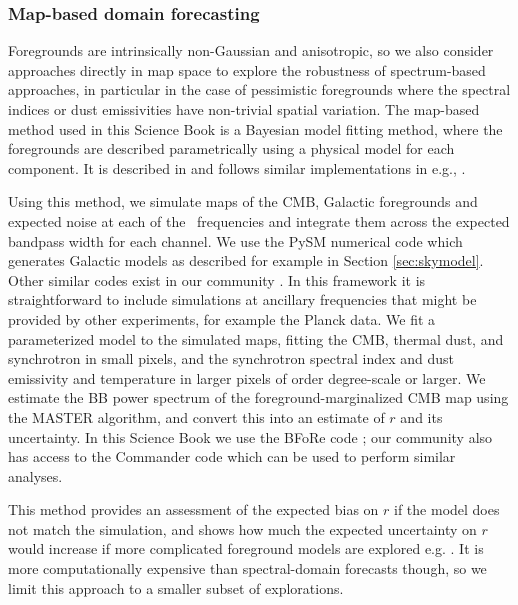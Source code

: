 \subsubsection{Map-based domain forecasting}

Foregrounds are intrinsically non-Gaussian and anisotropic, so we also consider approaches directly in map space to explore the robustness of spectrum-based approaches, in particular in the case of pessimistic foregrounds where the spectral indices or dust emissivities have non-trivial spatial variation. The map-based method used in this Science Book is a Bayesian model fitting method, where the foregrounds are described parametrically using a physical model for each component. It is described in \cite{Alonso:prep} and follows similar implementations in e.g., \cite{Eriksen:2005dr}.

Using this method, we simulate maps of the CMB, Galactic foregrounds and expected noise at each of the \cmbexp\ frequencies and integrate them across the expected bandpass width for each channel. We use the PySM numerical code \cite{PySM} which generates Galactic models as described for example in Section \ref{sec:skymodel}. Other similar codes exist in our community \cite{Delabrouille:2012ye}. In this framework it is straightforward to include simulations at ancillary frequencies that might be provided by other experiments, for example the Planck data. We fit a parameterized model to the simulated maps, fitting the CMB, thermal dust, and synchrotron in small pixels, and the synchrotron spectral index and dust emissivity and temperature in larger pixels of order degree-scale or larger. We estimate the BB power spectrum of the foreground-marginalized CMB map using the MASTER \cite{Hivon:2001jp} algorithm, and convert this into an estimate of $r$ and its uncertainty. In this Science Book we use the BFoRe code \cite{Alonso:prep}; our community also has access to the Commander code which can be used to perform similar analyses.

This method provides an assessment of the expected bias on $r$ if the model does not match the simulation, and shows how much the expected uncertainty on $r$ would increase if more complicated foreground models are explored e.g. \cite{ArmitageCaplan:2011sn,Remazeilles:2015hpa}. It is more computationally expensive than spectral-domain forecasts though, so we limit this approach to a smaller subset of explorations. 

